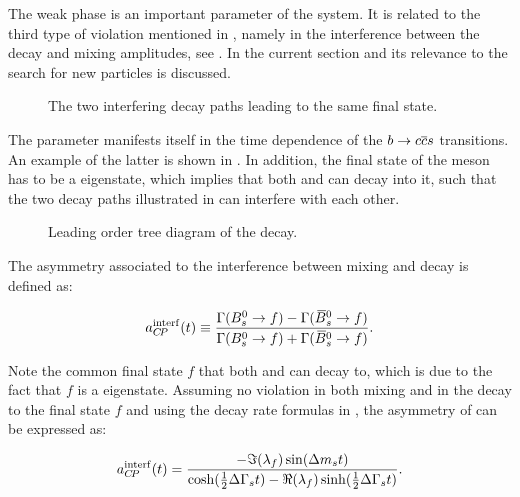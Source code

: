 The weak phase \phis is an important parameter of the \BBbarSyst system. It is related to the third
type of \CP violation mentioned in , namely in the interference between
the decay and mixing amplitudes, see . In the current section \phis and
its relevance to the search for new particles is discussed.

\newcommand{\ffig}{f}
\begin{figure}[h]
  \centering
  \resizebox{0.4\textwidth}{!}{}
  \caption{The two interfering decay paths leading to the same final state.}
  \label{interference}
\end{figure}

The parameter \phis manifests itself in the time dependence of the $b \rightarrow c\overline {c}s$ transitions.
An example of the latter is shown in . In addition, the final state of the \Bs meson has to be
a \CP eigenstate, which implies that both \Bs and \Bsb can decay into it, such that the two decay paths
illustrated in  can interfere with each other.

\begin{figure}[!h]
  \centering
  {\sffamily }
  \caption{Leading order tree diagram of the \BsJpsiPhi decay.}
  \label{bs2jpsiphi}
\end{figure}

The asymmetry associated to the interference between mixing and decay is defined as:

\begin{equation}
  \centering
  a_{\CP}^{\rm interf}(t) \equiv \frac{\Gamma(\Bs \to f) - \Gamma(\Bsb \to f)} {\Gamma(\Bs \to f) + \Gamma(\Bsb \to f)}.
\label{cpv_interf_def}
\end{equation}

\noindent Note the common final state $f$ that both \Bs and \Bsb can decay to, which is due to the fact
that $f$ is a \CP eigenstate. Assuming no \CP violation in both \BBbarSyst mixing and in the decay to the
final state $f$ and using the \BBbarSyst decay rate formulas in , the
asymmetry of  can be expressed as:

\newcommand{\half}{\frac{1}{2}}
\begin{equation}
  \centering
  a_{\CP}^{\rm interf}(t) = \frac{ - \Im(\lambda_f) \sin(\Delta m_s t)} {\cosh(\half \Delta\Gamma_s t) - \Re(\lambda_f)\sinh(\half\Delta\Gamma_s t)}.
\label{cpv_interf}
\end{equation}

